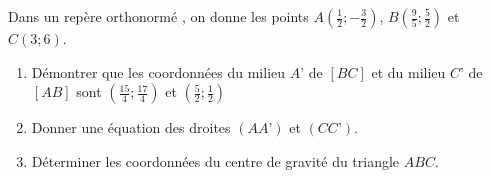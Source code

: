 
Dans un repère orthonormé \Oij, on donne les points $A\left( \frac{1}{2}; -\frac{3}{2} \right) $, $B\left( \frac{9}{5}; \frac{5}{2} \right)$ et $C(3;6)$.
\begin{enumerate}
\item Démontrer que les coordonnées du milieu $A’$ de $[BC]$ et du milieu $C’$ de $[AB]$ sont $\left( \frac{15}{4}; \frac{17}{4} \right)$  et $\left( \frac{5}{2}; \frac{1}{2} \right)$  
\item  Donner une équation des droites $(AA’)$ et $(CC’)$.     
\item  Déterminer les coordonnées du centre de gravité du triangle $ABC$.
\end{enumerate}